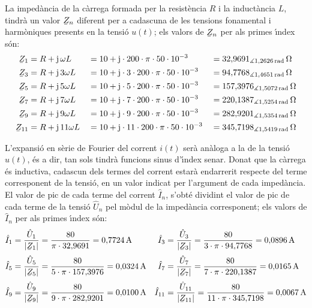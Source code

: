 \begin{exemple}
La imped\`{a}ncia de la c\`{a}rrega formada per la resist\`{e}ncia $R$ i la
induct\`{a}ncia $L$, tindr\`{a} un valor $\cmplx{Z}_n$ diferent per a
cadascuna de les tensions fonamental i harm\`{o}niques presents en la
tensi\'{o} $u(t)$; els valors de $\cmplx{Z}_n$ per als primes \'{\i}ndex s\'{o}n:
\begin{alignat*}{3}
    \cmplx{Z}_1 &= R + \ju\, \omega L &&= 10 + \ju\cdot 200\cdot \pi\cdot 50\cdot 10^{-3} &&=32{,}9691_{\measuredangle
    1{,}2626\unit{rad}}\unit{\ohm}\\
    \cmplx{Z}_3 &= R + \ju\, 3 \omega L &&= 10 + \ju\cdot 3\cdot 200\cdot \pi\cdot 50\cdot 10^{-3} &&=94{,}7768_{\measuredangle
    1{,}4651\unit{rad}}\unit{\ohm}\\
    \cmplx{Z}_5 &= R + \ju\, 5 \omega L &&= 10 + \ju\cdot 5\cdot 200\cdot \pi\cdot 50\cdot 10^{-3} &&=157{,}3976_{\measuredangle
    1{,}5072\unit{rad}}\unit{\ohm}\\
    \cmplx{Z}_7 &= R + \ju\, 7 \omega L &&= 10 + \ju\cdot 7\cdot 200\cdot \pi\cdot 50\cdot 10^{-3} &&=220{,}1387_{\measuredangle
    1{,}5254\unit{rad}}\unit{\ohm}\\
    \cmplx{Z}_9 &= R + \ju\, 9 \omega L &&= 10 + \ju\cdot 9\cdot 200\cdot \pi\cdot 50\cdot 10^{-3} &&=282{,}9201_{\measuredangle
    1{,}5354\unit{rad}}\unit{\ohm}\\
    \cmplx{Z}_{11} &= R + \ju\, 11 \omega L &&= 10 + \ju\cdot 11\cdot 200\cdot \pi\cdot 50\cdot 10^{-3} &&=345{,}7198_{\measuredangle
    1{,}5419\unit{rad}}\unit{\ohm}
\end{alignat*}

L'expansi\'{o} en s\`{e}rie de Fourier del corrent $i(t)$ ser\`{a} an\`{a}loga a la
de la tensi\'{o} $u(t)$, \'{e}s a dir, tan sols tindr\`{a} funcions sinus
d'\'{\i}ndex senar. Donat que la c\`{a}rrega \'{e}s inductiva, cadascun dels
termes del corrent estar\`{a} endarrerit respecte del terme corresponent
de la tensi\'{o}, en un valor indicat per l'argument de cada imped\`{a}ncia.
El valor de pic de cada terme del corrent $\hat{I}_n$, s'obt\'{e}
dividint el valor de pic de cada terme de la tensi\'{o} $\hat{U}_n$ pel
m\`{o}dul de la imped\`{a}ncia corresponent; els valors de $\hat{I}_n$ per
als primes \'{\i}ndex s\'{o}n:
\begin{align*}
    \hat{I}_1 &= \frac{\hat{U}_1}{|\cmplx{Z}_1|} = \frac{80}{\pi\cdot32{,}9691} = 0{,}7724\unit{A}
    & \hat{I}_3 &= \frac{\hat{U}_3}{|\cmplx{Z}_3|} =\frac{80}{3\cdot\pi\cdot 94{,}7768} = 0{,}0896\unit{A}\\[0.5ex]
    \hat{I}_5 &= \frac{\hat{U}_5}{|\cmplx{Z}_5|} =\frac{80}{5\cdot\pi\cdot 157{,}3976} =0{,}0324\unit{A}
    & \hat{I}_7 &= \frac{\hat{U}_7}{|\cmplx{Z}_7|} =\frac{80}{7\cdot\pi\cdot 220{,}1387} =
    0{,}0165\unit{A}\\[0.5ex]
    \hat{I}_9 &= \frac{\hat{U}_9}{|\cmplx{Z}_9|} =\frac{80}{9\cdot\pi\cdot 282{,}9201} =
    0{,}0100\unit{A} & \hat{I}_{11} &= \frac{\hat{U}_{11}}{|\cmplx{Z}_{11}|} =\frac{80}
    {11\cdot\pi\cdot 345{,}7198} =  0{,}0067\unit{A}
\end{align*}


\end{exemple}
